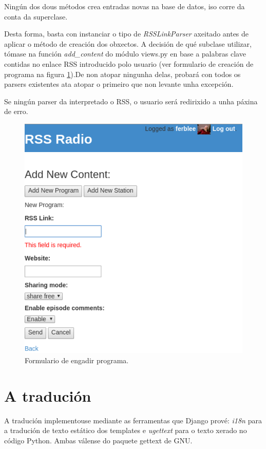 Ningún dos dous métodos crea entradas novas na base de datos, iso corre da conta da superclase.

Desta forma, basta con instanciar o tipo de \textit{RSSLinkParser} axeitado antes de aplicar o método de creación dos obxectos. A decisión de qué subclase utilizar, tómase na función \textit{add\_content} do módulo views.py en base a palabras clave contidas no enlace RSS introducido polo usuario (ver formulario de creación de programa na figura \ref{fig:add_program}).De non atopar ningunha delas, probará con todos os parsers existentes ata atopar o primeiro que non levante unha excepción. 

Se ningún parser da interpretado o RSS, o usuario será redirixido a unha páxina de erro.

\begin{figure}[h]
	\centering
	\includegraphics[scale=0.6,keepaspectratio=true]{./images/add_program_final.png}
	\caption{Formulario de engadir programa.}
	\label{fig:add_program}
\end{figure} 

\section{A tradución}

A tradución implementouse mediante as ferramentas que Django prové: \textit{i18n} para a tradución de texto estático dos templates e \textit{ugettext} para o texto xerado no código Python. Ambas válense do paquete gettext de GNU. 

